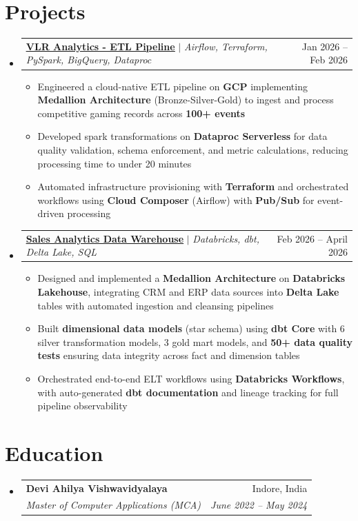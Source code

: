 \documentclass[letterpaper,11pt]{article}
\makeatletter
\newcommand{\resumeItem}[1]{
\item\small{
    {#1 \vspace{-2pt}}
  }
}
\newcommand{\resumeSubheading}[4]{
  \vspace{-2pt}
\item
  \begin{tabular*}{0.97\textwidth}[t]{l@{\extracolsep{\fill}}r}
    \textbf{#1} & #2 \\
    \textit{\small#3} & \textit{\small #4} \\
  \end{tabular*}\vspace{-7pt}
}
\newcommand{\resumeProjectHeading}[2]{
\item
  \begin{tabular*}{0.97\textwidth}{l@{\extracolsep{\fill}}r}
    \small#1 & #2 \\
  \end{tabular*}\vspace{-4pt}
}
\newcommand{\resumeSubHeadingListStart}{
\begin{itemize}[leftmargin=0.15in, label={}]}
\newcommand{\resumeSubHeadingListEnd}{
\end{itemize}}
\newcommand{\resumeItemListStart}{
\begin{itemize}}
\newcommand{\resumeItemListEnd}{
\end{itemize}\vspace{-5pt}}
\makeatother
\begin{document}
\section{Projects}
\resumeSubHeadingListStart

\resumeProjectHeading
{\textbf{\href{https://github.com/pvcodes/vlr-analytics}{\underline{VLR Analytics - ETL Pipeline}}} $|$ \emph{Airflow, Terraform, PySpark, BigQuery, Dataproc}}{Jan 2026 -- Feb 2026}
\resumeItemListStart
\resumeItem{Engineered a cloud-native ETL pipeline on \textbf{GCP} implementing \textbf{Medallion Architecture} (Bronze-Silver-Gold) to ingest and process competitive gaming records across \textbf{100+ events}}
\resumeItem{Developed spark transformations on \textbf{Dataproc Serverless} for data quality validation, schema enforcement, and metric calculations, reducing processing time to under 20 minutes}
\resumeItem{Automated infrastructure provisioning with \textbf{Terraform} and orchestrated workflows using \textbf{Cloud Composer} (Airflow) with \textbf{Pub/Sub} for event-driven processing}
\resumeItemListEnd

\resumeProjectHeading
{\textbf{\href{https://github.com/pvcodes/sales-dwh-databricks-dbt}{\underline{Sales Analytics Data Warehouse}}} $|$ \emph{Databricks, dbt, Delta Lake, SQL}}{Feb 2026 -- April 2026}
\resumeItemListStart
\resumeItem{Designed and implemented a \textbf{Medallion Architecture} on \textbf{Databricks Lakehouse}, integrating CRM and ERP data sources into \textbf{Delta Lake} tables with automated ingestion and cleansing pipelines}
\resumeItem{Built \textbf{dimensional data models} (star schema) using \textbf{dbt Core} with 6 silver transformation models, 3 gold mart models, and \textbf{50+ data quality tests} ensuring data integrity across fact and dimension tables}
\resumeItem{Orchestrated end-to-end ELT workflows using \textbf{Databricks Workflows}, with auto-generated \textbf{dbt documentation} and lineage tracking for full pipeline observability}
\resumeItemListEnd

\resumeSubHeadingListEnd

\vspace{-10pt}
\section{Education}
\resumeSubHeadingListStart
\resumeSubheading
{Devi Ahilya Vishwavidyalaya}{Indore, India}
{Master of Computer Applications (MCA)}{June 2022 -- May 2024}
\resumeSubHeadingListEnd
\end{document}
